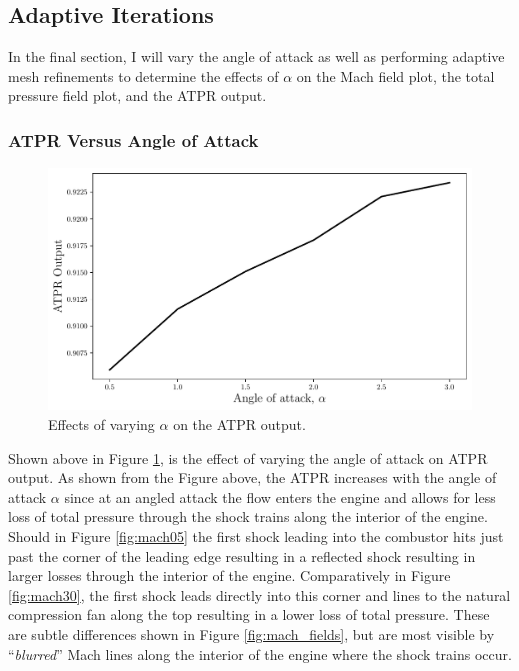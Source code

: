 \pagebreak
\subsection{Adaptive Iterations}

In the final section, I will vary the angle of attack as well as performing adaptive mesh refinements to determine the effects of $\alpha$ on the Mach field plot, the total pressure field plot, and the ATPR output. 

\subsubsection{ATPR Versus Angle of Attack}
\begin{figure}[h]
    \centering
    \includegraphics[width = 0.9\linewidth]{rep/q5/ATPR.pdf}
    \caption[ATPR and Angle of Attack]{Effects of varying $\alpha$ on the ATPR output.}
    \label{fig:aoa_ATPR}
\end{figure}

Shown above in Figure \ref{fig:aoa_ATPR}, is the effect of varying the angle of attack on ATPR output. As shown from the Figure above, the ATPR increases with the angle of attack $\alpha$ since at an angled attack the flow enters the engine and allows for less loss of total pressure through the shock trains along the interior of the engine. Should in Figure \ref{fig:mach05} the first shock leading into the combustor hits just past the corner of the leading edge resulting in a reflected shock resulting in larger losses through the interior of the engine. Comparatively in Figure \ref{fig:mach30}, the first shock leads directly into this corner and lines to the natural compression fan along the top resulting in a lower loss of total pressure. These are subtle differences shown in Figure \ref{fig:mach_fields}, but are most visible by ``\textit{blurred}'' Mach lines along the interior of the engine where the shock trains occur.

